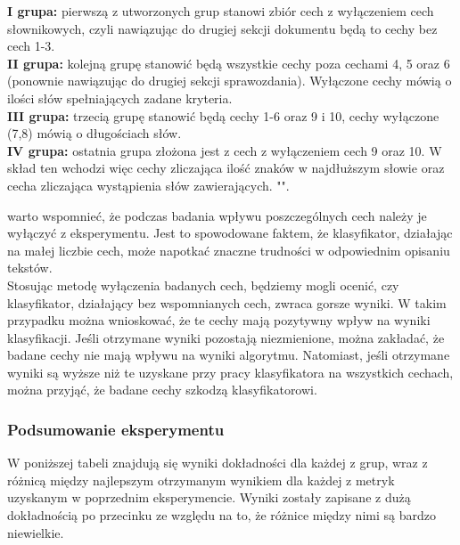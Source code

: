 \documentclass{article}
\begin{document}
\noindent \textbf{I grupa: } pierwszą z utworzonych grup stanowi zbiór cech z wyłączeniem cech słownikowych, czyli nawiązując do drugiej sekcji dokumentu będą to cechy bez cech 1-3. \\

\noindent \textbf{II grupa: } kolejną grupę stanowić będą wszystkie cechy poza cechami 4, 5 oraz 6 (ponownie nawiązując do drugiej sekcji sprawozdania). Wyłączone cechy mówią o ilości słów spełniających zadane kryteria. \\

\noindent \textbf{III grupa: } trzecią grupę stanowić będą cechy 1-6 oraz 9 i 10, cechy wyłączone (7,8) mówią o długościach słów. \\

\noindent \textbf{IV grupa: } ostatnia grupa złożona jest z cech z wyłączeniem cech 9 oraz 10. W skład ten wchodzi więc cechy zliczająca ilość znaków w najdłuższym słowie oraz cecha zliczająca wystąpienia słów zawierających. "\textendash".

\noindent warto wspomnieć, że podczas badania wpływu poszczególnych cech należy je wyłączyć z eksperymentu. Jest to spowodowane faktem, że klasyfikator, działając na małej liczbie cech, może napotkać znaczne trudności w odpowiednim opisaniu tekstów. \\

\noindent Stosując metodę wyłączenia badanych cech, będziemy mogli ocenić, czy klasyfikator, działający bez wspomnianych cech, zwraca gorsze wyniki. W takim przypadku można wnioskować, że te cechy mają pozytywny wpływ na wyniki klasyfikacji. Jeśli otrzymane wyniki pozostają niezmienione, można zakładać, że badane cechy nie mają wpływu na wyniki algorytmu. Natomiast, jeśli otrzymane wyniki są wyższe niż te uzyskane przy pracy klasyfikatora na wszystkich cechach, można przyjąć, że badane cechy szkodzą klasyfikatorowi. \\






\subsubsection*{Podsumowanie eksperymentu}

W poniższej tabeli znajdują się wyniki dokładności dla każdej z grup, wraz z różnicą między najlepszym otrzymanym wynikiem dla każdej z metryk uzyskanym w poprzednim eksperymencie. Wyniki zostały zapisane z dużą dokładnością po przecinku ze względu na to, że różnice między nimi są bardzo niewielkie. \\
\end{document}
